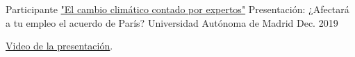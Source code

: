   \cventry
    {Participante \href{https://workshops.ift.uam-csic.es/cambioclimatico/Programa}{"El cambio climático contado por expertos"}} %
    {Presentación: ¿Afectará a tu empleo el acuerdo de París?} %
    {Universidad Autónoma de Madrid} %
    {Dec. 2019} %
    {
    \begin{cvitems} %
        \item {\underline{\href{https://m.youtube.com/watch?v=rB3-6bywW_Q}{Video de la presentación}}.}        	\end{cvitems}
    }
    